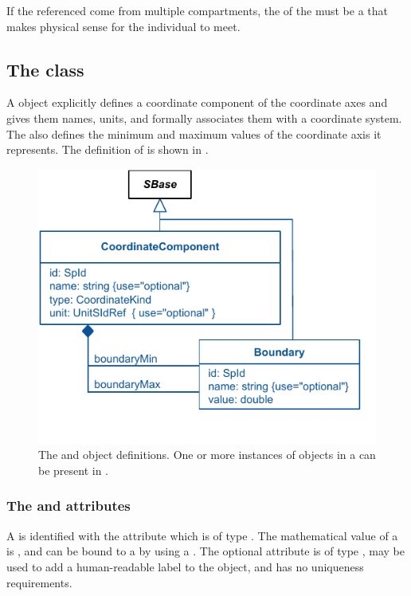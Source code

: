 If the referenced \Species come from multiple compartments, the  of the \Reaction must be a \Compartment that makes physical sense for the individual \Species to meet.

\subsection{The  class}
\label{coordinatecomponent-class}
A \CoordinateComponent object explicitly defines a coordinate component of the coordinate axes and gives them names, units, and formally associates them with a coordinate system. The \CoordinateComponent also defines the minimum and maximum values of the coordinate axis it represents. The definition of \CoordinateComponent is shown in .
 
\begin{figure}[ht]
  \includegraphics{figs/CoordinateComponent-uml}
  \caption{The \CoordinateComponent and \Boundary object definitions. One or more instances of \CoordinateComponent objects in a \ListOfCoordinateComponents can be present in \Geometry.}
  \label{CoordinateComponent-uml}
\end{figure}


\subsubsection{The \fixttspace{} and \fixttspace{} attributes}
A \CoordinateComponent is identified with the  attribute which is of type .  The mathematical value of a \CoordinateComponent is , and can be bound to a \Parameter by using a \SpatialSymbolReference {}.  The optional  attribute is of type , may be used to add a human-readable label to the object, and has no uniqueness requirements.
 

